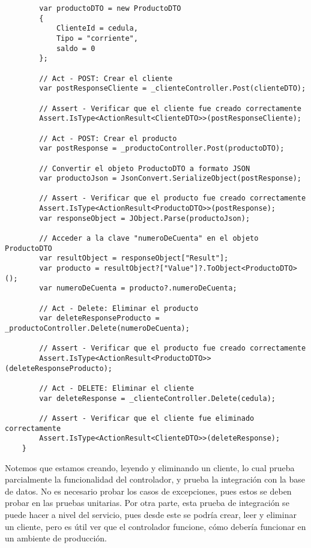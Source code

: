 \documentclass[executivepaper]{article}
\begin{document}
\begin{lstlisting}
        var productoDTO = new ProductoDTO
        {
            ClienteId = cedula,
            Tipo = "corriente",
            saldo = 0
        };

        // Act - POST: Crear el cliente
        var postResponseCliente = _clienteController.Post(clienteDTO);

        // Assert - Verificar que el cliente fue creado correctamente
        Assert.IsType<ActionResult<ClienteDTO>>(postResponseCliente);

        // Act - POST: Crear el producto
        var postResponse = _productoController.Post(productoDTO);

        // Convertir el objeto ProductoDTO a formato JSON
        var productoJson = JsonConvert.SerializeObject(postResponse);

        // Assert - Verificar que el producto fue creado correctamente
        Assert.IsType<ActionResult<ProductoDTO>>(postResponse);
        var responseObject = JObject.Parse(productoJson);

        // Acceder a la clave "numeroDeCuenta" en el objeto ProductoDTO
        var resultObject = responseObject["Result"];
        var producto = resultObject?["Value"]?.ToObject<ProductoDTO>();
        var numeroDeCuenta = producto?.numeroDeCuenta;

        // Act - Delete: Eliminar el producto
        var deleteResponseProducto = _productoController.Delete(numeroDeCuenta);

        // Assert - Verificar que el producto fue creado correctamente
        Assert.IsType<ActionResult<ProductoDTO>>(deleteResponseProducto);

        // Act - DELETE: Eliminar el cliente
        var deleteResponse = _clienteController.Delete(cedula);

        // Assert - Verificar que el cliente fue eliminado correctamente
        Assert.IsType<ActionResult<ClienteDTO>>(deleteResponse);
    }
\end{lstlisting}

Notemos que estamos creando, leyendo y eliminando un cliente, lo cual prueba parcialmente la funcionalidad del controlador, y prueba la integración con la base de datos. No es necesario probar los casos de excepciones, pues estos se deben probar en las pruebas unitarias. Por otra parte, esta prueba de integración se puede hacer a nivel del servicio, pues desde este se podría crear, leer y eliminar un cliente, pero es útil ver que el controlador funcione, cómo debería funcionar en un ambiente de producción.
\end{document}
